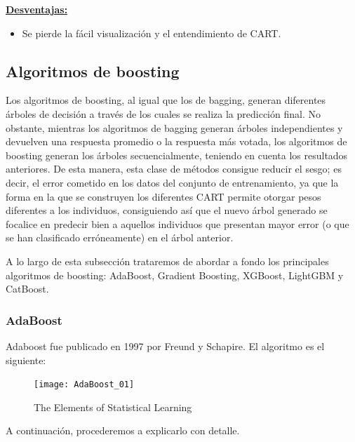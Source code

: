\documentclass[12pt,twoside]{article}
\begin{document}
\textbf{\underline{Desventajas:}}
\begin{itemize}
\item Se pierde la fácil visualización y el entendimiento de CART.
\end{itemize}


\newpage
\subsection{Algoritmos de boosting}
Los algoritmos de boosting, al igual que los de bagging, generan diferentes árboles de decisión a través de los cuales se realiza la predicción final. No obstante, mientras los algoritmos de bagging generan árboles independientes y devuelven una respuesta promedio o la respuesta más votada, los algoritmos de boosting generan los árboles secuencialmente, teniendo en cuenta los resultados anteriores. De esta manera, esta clase de métodos consigue reducir el sesgo; es decir, el error cometido en los datos del conjunto de entrenamiento, ya que la forma en la que se construyen los diferentes CART permite otorgar pesos diferentes a los individuos, consiguiendo así que el nuevo árbol generado se focalice en predecir bien a aquellos individuos que presentan mayor error (o que se han clasificado erróneamente) en el árbol anterior.

A lo largo de esta subsección trataremos de abordar a fondo los principales algoritmos de boosting: AdaBoost, Gradient Boosting, XGBoost, LightGBM y CatBoost.


\subsubsection{AdaBoost}
Adaboost fue publicado en 1997 por Freund y Schapire. El algoritmo es el siguiente:
\begin{figure}[h]
\centering
\texttt{[image: AdaBoost\_01]}
\caption{The Elements of Statistical Learning}
\label{fig: AdaBoost_01}
\end{figure}

A continuación, procederemos a explicarlo con detalle.
\end{document}
